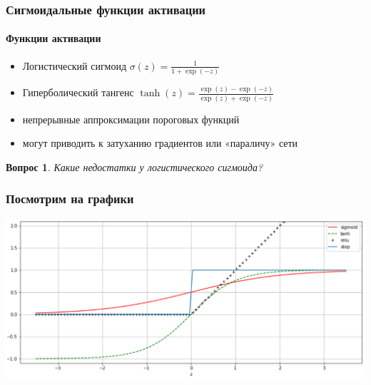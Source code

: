 \documentclass[fullscreen=true, bookmarks=true, hyperref={pdfencoding=unicode}]{beamer}
\newtheorem*{question}{Вопрос}
\begin{document}
\begin{frame}
  \frametitle{Сигмоидальные функции активации}
  \framesubtitle{Функции активации}
  \begin{itemize}
    \item Логистический сигмоид
    $\sigma(z) = \frac{1}{1+\exp(-z)}$

    \item Гиперболический тангенс
    $\tanh(z) = \frac{\exp(z)-\exp(-z)}{\exp(z)+\exp(-z)}$

    \item непрерывные аппроксимации пороговых функций
    \item могут приводить к затуханию градиентов или «параличу» сети
  \end{itemize}
  \begin{question}
  Какие недостатки у логистического сигмоида?
  \end{question}
\end{frame}


\begin{frame}
  \frametitle{Посмотрим на графики}
  \begin{center}
    \includegraphics[keepaspectratio,
                     width=0.7\paperwidth]{sigm_relu.png}
  \end{center}
\end{frame}
\end{document}
